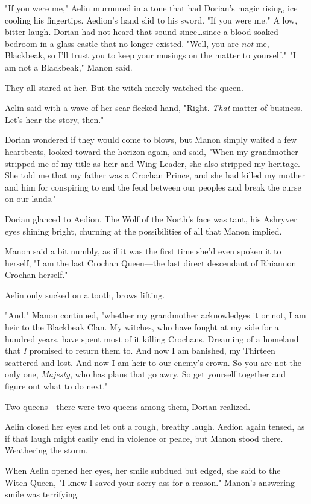 "If you were me," Aelin murmured in a tone that had Dorian's magic rising, ice cooling his fingertips.
Aedion's hand slid to his sword.
"If you were me."
A low, bitter laugh.
Dorian had not heard that sound since\ldots since a blood-soaked bedroom in a glass castle that no longer existed.
"Well, you are \emph{not} me, Blackbeak, so I'll trust you to keep your musings on the matter to yourself."
"I am not a Blackbeak," Manon said.

They all stared at her.
But the witch merely watched the queen.

Aelin said with a wave of her scar-flecked hand, "Right.
\emph{That}
matter of business.
Let's hear the story, then."

Dorian wondered if they would come to blows, but Manon simply waited a few heartbeats, looked toward the horizon again, and said, "When my grandmother stripped me of my title as heir and Wing Leader, she also stripped my heritage.
She told me that my father was a Crochan Prince, and she had killed my mother and him for conspiring to end the feud between our peoples and break the curse on our lands."

Dorian glanced to Aedion.
The Wolf of the North's face was taut, his Ashryver eyes shining bright, churning at the possibilities of all that Manon implied.

Manon said a bit numbly, as if it was the first time she'd even spoken it to herself, "I am the last Crochan Queen---the last direct descendant of Rhiannon Crochan herself."

Aelin only sucked on a tooth, brows lifting.

"And," Manon continued, "whether my grandmother acknowledges it or not, I am heir to the Blackbeak Clan.
My witches, who have fought at my side for a hundred years, have spent most of it killing Crochans.
Dreaming of a homeland that \emph{I} promised to return them to.
And now I am banished, my Thirteen scattered and lost.
And now I am heir to our enemy's crown.
So you are not the only one, \emph{Majesty}, who has plans that go awry.
So get yourself together and figure out what to do next."

Two queens---there were two queens among them, Dorian realized.

Aelin closed her eyes and let out a rough, breathy laugh.
Aedion again tensed, as if that laugh might easily end in violence or peace, but Manon stood there.
Weathering the storm.

When Aelin opened her eyes, her smile subdued but edged, she said to the Witch-Queen, "I knew I saved your sorry ass for a reason."
Manon's answering smile was terrifying.

